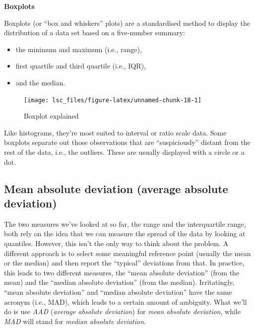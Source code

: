 \documentclass[
]{book}
\providecommand{\tightlist}{%
  \setlength{\itemsep}{0pt}\setlength{\parskip}{0pt}}
\newenvironment{callouttitle}{}{}
\theoremstyle{definition}
\theoremstyle{definition}
\theoremstyle{definition}
\theoremstyle{definition}
\theoremstyle{remark}
\begin{document}
\hypertarget{boxplot}{}
\begin{callout}

\begin{callouttitle}
\textbf{Boxplots}

\end{callouttitle}

\nopagebreak

Boxplots (or ``box and whiskers'' plots) are a standardised method to display the distribution of a data set based on a five-number summary:

\begin{itemize}
\tightlist
\item
  the minimum and maximum (i.e., range),
\item
  first quartile and third quartile (i.e., IQR),
\item
  and the median.
\end{itemize}

\begin{figure}

{\centering \texttt{[image: lsc\_files/figure-latex/unnamed-chunk-18-1]} 

}

\caption{Boxplot explained}\label{fig:unnamed-chunk-18}
\end{figure}

Like histograms, they're most suited to interval or ratio scale data. Some boxplots separate out those observations that are ``suspiciously'' distant from the rest of the data, i.e., the outliers. These are usually displayed with a circle or a dot.

\end{callout}

\hypertarget{aad}{%
\subsection{Mean absolute deviation (average absolute deviation)}\label{aad}}

The two measures we've looked at so far, the range and the interquartile range, both rely on the idea that we can measure the spread of the data by looking at quantiles. However, this isn't the only way to think about the problem. A different approach is to select some meaningful reference point (usually the mean or the median) and then report the ``typical'' deviations from that. In practice, this leads to two different measures, the ``mean absolute deviation'' (from the mean) and the ``median absolute deviation'' (from the median). Irritatingly, ``mean absolute deviation'' and ``median absolute deviation'' have the same acronym (i.e., MAD), which leads to a certain amount of ambiguity. What we'll do is use \emph{AAD} (\emph{average absolute deviation}) for \emph{mean absolute deviation}, while \emph{MAD} will stand for \emph{median absolute deviation}.
\end{document}
